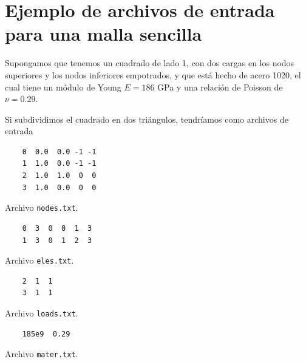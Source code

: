 \documentclass[12pt,letterpaper]{article}
\begin{document}
\appendix
\section{Ejemplo de archivos de entrada para una malla sencilla}
Supongamos que tenemos un cuadrado de lado 1, con dos cargas en los nodos superiores y los nodos inferiores empotrados, y que está hecho de acero 1020, el cual tiene un módulo de Young $E = 186$ GPa y una relación de Poisson de $\nu = 0.29$.

Si subdividimos el cuadrado en dos triángulos, tendríamos como archivos de entrada
\begin{listing}[H]
    \begin{verbatim}
    0  0.0  0.0 -1 -1
    1  1.0  0.0 -1 -1
    2  1.0  1.0  0  0
    3  1.0  0.0  0  0
    \end{verbatim}
    \caption{Archivo \texttt{nodes.txt}.}
    \label{lst:nodes}
\end{listing}


\begin{listing}[H]
    \begin{verbatim}
    0  3  0  0  1  3 
    1  3  0  1  2  3
    \end{verbatim}
    \caption{Archivo \texttt{eles.txt}.}
    \label{lst:elements}
\end{listing}

\begin{listing}[H]
    \begin{verbatim}
    2  1  1
    3  1  1
    \end{verbatim}
    \caption{Archivo \texttt{loads.txt}.}
    \label{lst:loads}
\end{listing}

\begin{listing}[H]
    \begin{verbatim}
    185e9  0.29
    \end{verbatim}
    \caption{Archivo \texttt{mater.txt}.}
    \label{lst:mater}
\end{listing}
\end{document}
